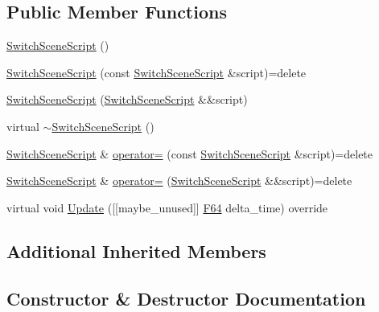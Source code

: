 \subsection*{Public Member Functions}
\begin{DoxyCompactItemize}
\item 
\hyperlink{classmage_1_1script_1_1_switch_scene_script_a7905bc08a81fbf2680e1b9e88a94988d}{Switch\+Scene\+Script} ()
\item 
\hyperlink{classmage_1_1script_1_1_switch_scene_script_a3964619fd1864de4e09c67723f665a90}{Switch\+Scene\+Script} (const \hyperlink{classmage_1_1script_1_1_switch_scene_script}{Switch\+Scene\+Script} \&script)=delete
\item 
\hyperlink{classmage_1_1script_1_1_switch_scene_script_ab934d2ed3fbb2d0ea7a2848446d0a5cb}{Switch\+Scene\+Script} (\hyperlink{classmage_1_1script_1_1_switch_scene_script}{Switch\+Scene\+Script} \&\&script)
\item 
virtual \hyperlink{classmage_1_1script_1_1_switch_scene_script_ae4a846ba55d7b0ddb3730997ae162ba3}{$\sim$\+Switch\+Scene\+Script} ()
\item 
\hyperlink{classmage_1_1script_1_1_switch_scene_script}{Switch\+Scene\+Script} \& \hyperlink{classmage_1_1script_1_1_switch_scene_script_aeb69f01428c31fefd8e0d9b75aa7d3a9}{operator=} (const \hyperlink{classmage_1_1script_1_1_switch_scene_script}{Switch\+Scene\+Script} \&script)=delete
\item 
\hyperlink{classmage_1_1script_1_1_switch_scene_script}{Switch\+Scene\+Script} \& \hyperlink{classmage_1_1script_1_1_switch_scene_script_a69cbcb7b1216a3bc3422ff7db9340c27}{operator=} (\hyperlink{classmage_1_1script_1_1_switch_scene_script}{Switch\+Scene\+Script} \&\&script)=delete
\item 
virtual void \hyperlink{classmage_1_1script_1_1_switch_scene_script_a4915aa35bad8aab3ba024f0babfe4933}{Update} (\mbox{[}\mbox{[}maybe\+\_\+unused\mbox{]}\mbox{]} \hyperlink{namespacemage_ad26233bbec640deda836e572c1a23708}{F64} delta\+\_\+time) override
\end{DoxyCompactItemize}
\subsection*{Additional Inherited Members}


\subsection{Constructor \& Destructor Documentation}
\hypertarget{classmage_1_1script_1_1_switch_scene_script_a7905bc08a81fbf2680e1b9e88a94988d}{}\label{classmage_1_1script_1_1_switch_scene_script_a7905bc08a81fbf2680e1b9e88a94988d} 
